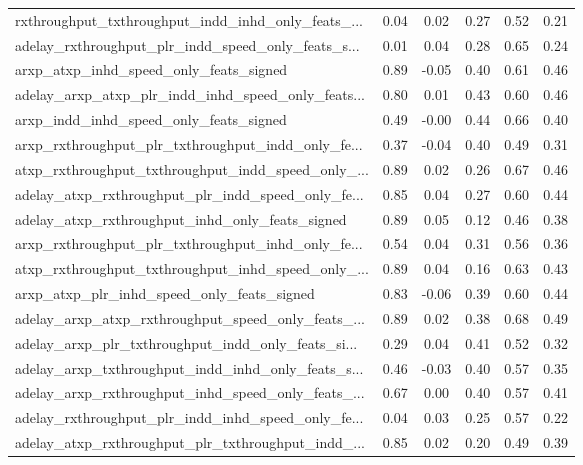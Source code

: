 \begin{tabular}{|l|*{4}{c}|r|}
rxthroughput\_txthroughput\_indd\_inhd\_only\_feats\_... & 0.04 &  0.02 &    0.27 &       0.52 &  0.21 \\
adelay\_rxthroughput\_plr\_indd\_speed\_only\_feats\_s... & 0.01 &  0.04 &    0.28 &       0.65 &  0.24 \\
arxp\_atxp\_inhd\_speed\_only\_feats\_signed             & 0.89 & -0.05 &    0.40 &       0.61 &  0.46 \\
adelay\_arxp\_atxp\_plr\_indd\_inhd\_speed\_only\_feats... & 0.80 &  0.01 &    0.43 &       0.60 &  0.46 \\
arxp\_indd\_inhd\_speed\_only\_feats\_signed             & 0.49 & -0.00 &    0.44 &       0.66 &  0.40 \\
arxp\_rxthroughput\_plr\_txthroughput\_indd\_only\_fe... & 0.37 & -0.04 &    0.40 &       0.49 &  0.31 \\
atxp\_rxthroughput\_txthroughput\_indd\_speed\_only\_... & 0.89 &  0.02 &    0.26 &       0.67 &  0.46 \\
adelay\_atxp\_rxthroughput\_plr\_indd\_speed\_only\_fe... & 0.85 &  0.04 &    0.27 &       0.60 &  0.44 \\
adelay\_atxp\_rxthroughput\_inhd\_only\_feats\_signed    & 0.89 &  0.05 &    0.12 &       0.46 &  0.38 \\
arxp\_rxthroughput\_plr\_txthroughput\_inhd\_only\_fe... & 0.54 &  0.04 &    0.31 &       0.56 &  0.36 \\
atxp\_rxthroughput\_txthroughput\_inhd\_speed\_only\_... & 0.89 &  0.04 &    0.16 &       0.63 &  0.43 \\
arxp\_atxp\_plr\_inhd\_speed\_only\_feats\_signed         & 0.83 & -0.06 &    0.39 &       0.60 &  0.44 \\
adelay\_arxp\_atxp\_rxthroughput\_speed\_only\_feats\_... & 0.89 &  0.02 &    0.38 &       0.68 &  0.49 \\
adelay\_arxp\_plr\_txthroughput\_indd\_only\_feats\_si... & 0.29 &  0.04 &    0.41 &       0.52 &  0.32 \\
adelay\_arxp\_txthroughput\_indd\_inhd\_only\_feats\_s... & 0.46 & -0.03 &    0.40 &       0.57 &  0.35 \\
adelay\_arxp\_rxthroughput\_inhd\_speed\_only\_feats\_... & 0.67 &  0.00 &    0.40 &       0.57 &  0.41 \\
adelay\_rxthroughput\_plr\_indd\_inhd\_speed\_only\_fe... & 0.04 &  0.03 &    0.25 &       0.57 &  0.22 \\
adelay\_atxp\_rxthroughput\_plr\_txthroughput\_indd\_... & 0.85 &  0.02 &    0.20 &       0.49 &  0.39 \\

\end{tabular}
